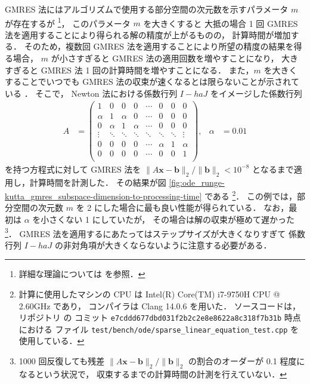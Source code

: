 GMRES 法にはアルゴリズムで使用する部分空間の次元数を示すパラメータ $m$ が存在するが
\footnote{詳細な理論については \cite[Section 11.4.3]{Golub2013} を参照．}，
このパラメータ $m$ を大きくすると
大抵の場合 1 回 GMRES 法を適用することにより得られる解の精度が上がるものの，
計算時間が増加する．
そのため，複数回 GMRES 法を適用することにより所望の精度の結果を得る場合，
$m$ が小さすぎると GMRES 法の適用回数を増やすことになり，
大きすぎると GMRES 法 1 回の計算時間を増やすことになる．
また，$m$ を大きくすることでいつでも GMRES 法の収束が速くなるとは限らないことが示されている
\cite{Blom2013}．
そこで，
Newton 法における係数行列 $I - h a J$ をイメージした係数行列
\begin{align}
    A      & =
    \begin{pmatrix}
        1      & 0      & 0      & 0      & \cdots & 0      & 0      & 0      \\
        \alpha & 1      & \alpha & 0      & \cdots & 0      & 0      & 0      \\
        0      & \alpha & 1      & \alpha & \cdots & 0      & 0      & 0      \\
        \vdots & \ddots & \ddots & \ddots & \ddots & \ddots & \ddots & \vdots \\
        0      & 0      & 0      & 0      & \cdots & \alpha & 1      & \alpha \\
        0      & 0      & 0      & 0      & \cdots & 0      & 0      & 1      \\
    \end{pmatrix}
    ,      &
    \alpha & = 0.01
    \label{eq:ode_runge-kutta_gmres_sample-coeff-matrix}
\end{align}
を持つ方程式に対して GMRES 法を
$\|A\bm{x} - \bm{b}\|_2 / \|\bm{b}\|_2 < 10^{-8}$
となるまで適用し，計算時間を計測した．
その結果が図 \ref{fig:ode_runge-kutta_gmres_subspace-dimension-to-processing-time} である
\footnote{計算に使用したマシンの CPU は Intel(R) Core(TM) i7-9750H CPU @ 2.60GHz であり，%
    コンパイラは Clang 14.0.6 を用いた．%
    ソースコードは，リポジトリ \cite{NumericalCollectionCpp} の%
    コミット \texttt{e7cddd677dbd031f2b2c2e8e8622a8c318f7b31b} 時点における%
    ファイル \texttt{test/bench/ode/sparse\_linear\_equation\_test.cpp} を使用している．}．
この例では，部分空間の次元数 $m$ を 2 にした場合に最も良い性能が得られている．
なお，最初は $\alpha$ を小さくない 1 にしていたが，
その場合は解の収束が極めて遅かった
\footnote{1000 回反復しても残差 $\|A\bm{x} - \bm{b}\|_2 / \|\bm{b}\|_2$ の割合のオーダーが%
    0.1 程度になるという状況で，%
    収束するまでの計算時間の計測を行えていない．}．
GMRES 法を適用するにあたってはステップサイズが大きくなりすぎて
係数行列 $I - h a J$ の非対角項が大きくならないように注意する必要がある．

